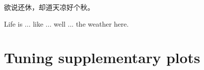 \begin{savequote}[8cm]
\begin{CJK*}{UTF8}{gbsn}
  欲说还休，却道天凉好个秋。
\end{CJK*}

Life is ... like ... well ... the weather here.

\end{savequote}

\chapter{\label{app:tuning}Tuning supplementary plots}

\minitoc



